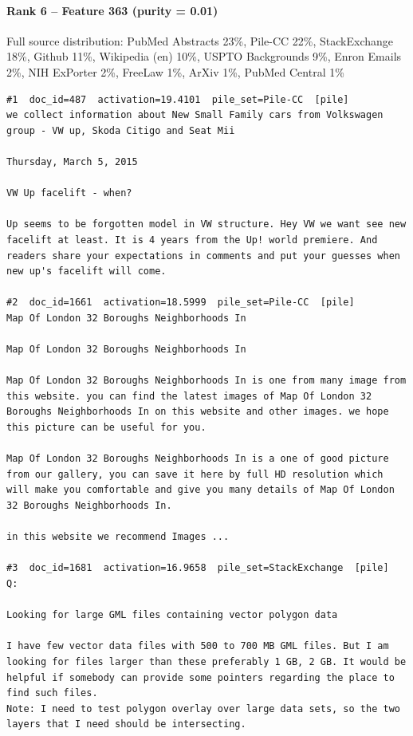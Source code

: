 \paragraph*{Rank 6 -- Feature 363 (purity = 0.01)}

Full source distribution: PubMed Abstracts 23\%, Pile-CC 22\%, StackExchange 18\%, Github 11\%, Wikipedia (en) 10\%, USPTO Backgrounds 9\%, Enron Emails 2\%, NIH ExPorter 2\%, FreeLaw 1\%, ArXiv 1\%, PubMed Central 1\%

\begin{verbatim}
#1  doc_id=487  activation=19.4101  pile_set=Pile-CC  [pile]
we collect information about New Small Family cars from Volkswagen group - VW up, Skoda Citigo and Seat Mii

Thursday, March 5, 2015

VW Up facelift - when?

Up seems to be forgotten model in VW structure. Hey VW we want see new facelift at least. It is 4 years from the Up! world premiere. And readers share your expectations in comments and put your guesses when new up's facelift will come.

#2  doc_id=1661  activation=18.5999  pile_set=Pile-CC  [pile]
Map Of London 32 Boroughs Neighborhoods In

Map Of London 32 Boroughs Neighborhoods In

Map Of London 32 Boroughs Neighborhoods In is one from many image from this website. you can find the latest images of Map Of London 32 Boroughs Neighborhoods In on this website and other images. we hope this picture can be useful for you.

Map Of London 32 Boroughs Neighborhoods In is a one of good picture from our gallery, you can save it here by full HD resolution which will make you comfortable and give you many details of Map Of London 32 Boroughs Neighborhoods In.

in this website we recommend Images ...

#3  doc_id=1681  activation=16.9658  pile_set=StackExchange  [pile]
Q:

Looking for large GML files containing vector polygon data

I have few vector data files with 500 to 700 MB GML files. But I am looking for files larger than these preferably 1 GB, 2 GB. It would be helpful if somebody can provide some pointers regarding the place to find such files.
Note: I need to test polygon overlay over large data sets, so the two layers that I need should be intersecting.


\end{verbatim}
